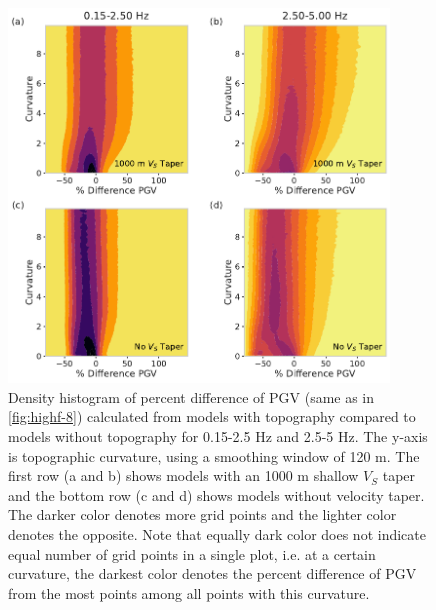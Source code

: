 \begin{figure}[!ht]
  \centering
  \includegraphics[width=0.9\textwidth,height=0.9\textheight,keepaspectratio]{figures/figure_highf_S3.pdf}
  \caption{
  Density histogram of percent difference of PGV (same as in \cref{fig:highf-8}) calculated from models with topography compared to models without topography for 0.15-2.5 Hz and 2.5-5 Hz. The y-axis is topographic curvature, using a smoothing window of 120 m. The first row (a and b) shows models with an 1000 m shallow $V_S$ taper and the bottom row (c and d) shows models without velocity taper. The darker color denotes more grid points and the lighter color denotes the opposite. Note that equally dark color does not indicate equal number of grid points in a single plot, i.e. at a certain curvature, the darkest color denotes the percent difference of PGV from the most points among all points with this curvature.
  }
  \label{fig:highf-S3}
\end{figure}
\clearpage




\renewcommand{\thetable}{\arabic{table}}
\renewcommand{\thefigure}{\arabic{figure}}


